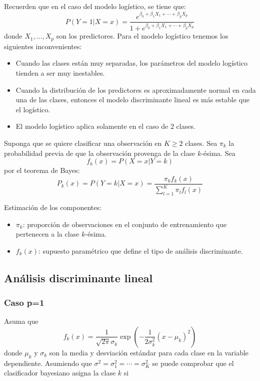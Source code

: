 \documentclass[
  12pt,
]{book}
\providecommand{\tightlist}{%
  \setlength{\itemsep}{0pt}\setlength{\parskip}{0pt}}
\begin{document}
Recuerden que en el caso del modelo logístico, se tiene que:
\[P(Y=1|X=x)=\frac{e^{\beta_0+\beta_1X_1+\cdots+\beta_pX_p}}{1+e^{\beta_0+\beta_1X_1+\cdots+\beta_pX_p}}\]
donde \(X_1,\ldots,X_p\) son los predictores. Para el modelo logístico
tenemos los siguientes inconvenientes:

\begin{itemize}
\item
  Cuando las clases están muy separadas, los parámetros del modelo
  logístico tienden a ser muy inestables.
\item
  Cuando la distribución de los predictores es aproximadamente normal en
  cada una de las clases, entonces el modelo discriminante lineal es más
  estable que el logístico.
\item
  El modelo logístico aplica solamente en el caso de 2 clases.
\end{itemize}

Suponga que se quiere clasificar una observación en \(K\geq 2\) clases.
Sea \(\pi_k\) la probabilidad previa de que la observación provenga de
la clase \(k\)-ésima. Sea \[f_k(x)=P(X=x|Y=k)\] por el teorema de Bayes:
\[P_k(x)=P(Y=k|X=x)=\frac{\pi_kf_k(x)}{\sum_{l=1}^K \pi_lf_l(x)}\]

Estimación de los componentes:

\begin{itemize}
\tightlist
\item
  \(\pi_k\): proporción de observaciones en el conjunto de entrenamiento
  que pertenecen a la clase \(k\)-ésima.
\item
  \(f_k(x)\): supuesto paramétrico que define el tipo de análisis
  discriminante.
\end{itemize}

\hypertarget{anuxe1lisis-discriminante-lineal}{%
\subsection{Análisis discriminante
lineal}\label{anuxe1lisis-discriminante-lineal}}

\hypertarget{caso-p1}{%
\subsubsection{Caso p=1}\label{caso-p1}}

Asuma que
\[f_k(x)=\frac{1}{\sqrt{2\pi}\sigma_k}\exp\left(-\frac{1}{2\sigma_k^2}(x-\mu_k)^2\right)\]
donde \(\mu_k\) y \(\sigma_k\) son la media y desviación estándar para
cada clase en la variable dependiente. Asumiendo que
\(\sigma^2=\sigma_1^2=\cdots=\sigma_K^2\) se puede comprobar que el
clasificador bayesiano asigna la clase \(k\) si
\end{document}
